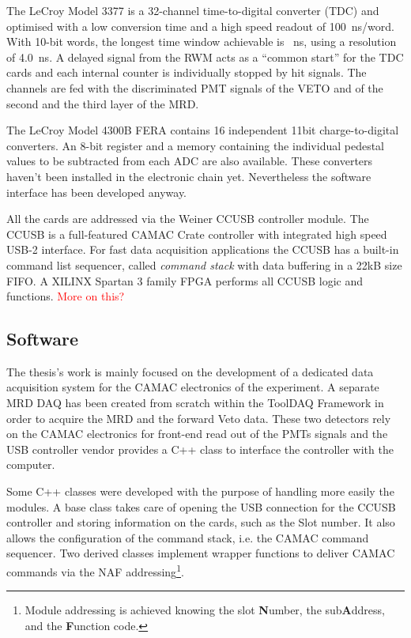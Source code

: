The LeCroy Model 3377 is a 32-channel time-to-digital converter (TDC) and %
optimised with a low conversion time and a high speed readout of 100~ns/word.
With 10-bit words, the longest time window achievable is ~ns, using a resolution %
of 4.0~ns.
A delayed signal from the RWM acts as a ``common start'' for the TDC cards and %
each internal counter is individually stopped by hit signals.
The channels are fed with the discriminated PMT signals of the VETO and of the second %
and the third layer of the MRD.

The LeCroy Model 4300B FERA contains 16 independent 11bit charge-to-digital converters.
An 8-bit register and a memory containing the individual pedestal values to be subtracted from %
each ADC are also available.
These converters haven't been installed in the electronic chain yet.
Nevertheless the software interface has been developed anyway.

All the cards are addressed via the Weiner CCUSB controller module. 
The CCUSB is a full-featured CAMAC Crate controller with integrated high speed USB-2 %
interface.
For fast data acquisition applications the CCUSB has a built-in command list sequencer, called %
\emph{command stack} with data buffering in a 22kB size FIFO.
A XILINX Spartan 3 family FPGA performs all CCUSB logic and functions. 
\textcolor{red}{More on this?}


\subsection{Software}

The thesis's work is mainly focused on the development of a dedicated data acquisition system %
for the CAMAC electronics of the experiment.
A separate MRD DAQ has been created from scratch within the ToolDAQ Framework in order %
to acquire the MRD and the forward Veto data.
These two detectors rely on the CAMAC electronics for front-end read out of the PMTs %
signals and the USB controller vendor provides a C++ class to interface the controller with the %
computer.

Some C++ classes were developed with the purpose of handling more easily the modules.
A base class takes care of opening the USB connection for the CCUSB controller and storing %
information on the cards, such as the Slot number.
It also allows the configuration of the command stack, i.e. the CAMAC command sequencer.
Two derived classes implement wrapper functions to deliver CAMAC commands via the %
NAF addressing\footnote{Module addressing is achieved knowing the slot \textbf{N}umber, %
the sub\textbf{A}ddress, and the \textbf{F}unction code.}.

